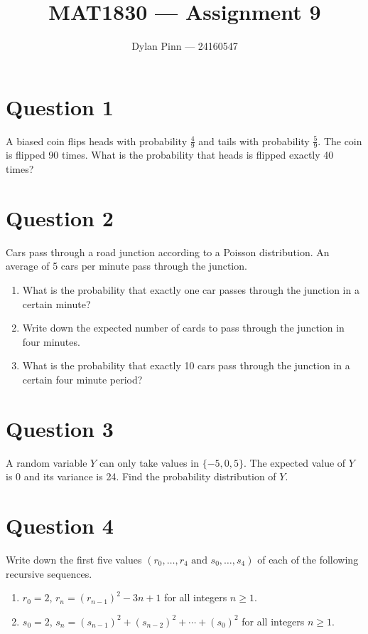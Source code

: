 \documentclass[11pt]{article}
\begin{document}
\title{MAT1830 --- Assignment 9}
\author{Dylan Pinn --- 24160547}
\maketitle

\section*{Question 1}

A biased coin flips heads with probability $\frac{4}{9}$ and tails with
probability $\frac{5}{9}$. The coin is flipped 90 times. What is the probability
that heads is flipped exactly 40 times?

\section*{Question 2}

Cars pass through a road junction according to a Poisson distribution. An
average of 5 cars per minute pass through the junction.

\begin{enumerate}[label= (\alph*)]
  \item What is the probability that exactly one car passes through the
    junction in a certain minute?

  \item Write down the expected number of cards to pass through the junction in
    four minutes.

  \item What is the probability that exactly 10 cars pass through the junction
    in a certain four minute period?

\end{enumerate}

\section*{Question 3}

A random variable $Y$ can only take values in $ \{ -5, 0, 5 \}$. The expected
value of $Y$ is 0 and its variance is 24. Find the probability distribution of
$Y$.

\section*{Question 4}

Write down the first five values $(r_0, \dots, r_4 \text{ and } s_0, \dots,
s_4)$ of each of the following recursive sequences.

\begin{enumerate}[label = (\alph*)]
  \item $r_0 = 2$, $r_n = {(r_{n-1})}^2 - 3n + 1$ for all integers $n \geq 1$.

  \item $s_0 = 2$, $s_n = {(s_{n-1})}^2 + {(s_{n-2})}^2 + \cdots + {(s_0)}^2$
  for all integers $n \geq 1$.

\end{enumerate}
\end{document}
